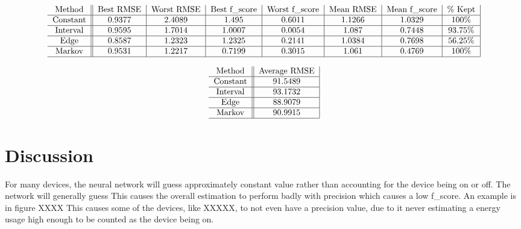 \documentclass{article}
\begin{document}
\begin{table*}[t]
	\centering
	
	$$\begin{tabular}{c||c|c|c|c|c|c|c|}
	Method & Best RMSE & Worst RMSE & Best f\_score & Worst f\_score & Mean RMSE & Mean f\_score & \% Kept\\
	\hline
	Constant & 0.9377 & 2.4089 & 1.495 & 0.6011 & 1.1266 & 1.0329 & 100\% \\
	\hline
	Interval & 0.9595 & 1.7014 & 1.0007 & 0.0054 & 1.087 & 0.7448 & 93.75\% \\
	\hline
	Edge & 0.8587 & 1.2323 & 1.2325 & 0.2141 & 1.0384 & 0.7698 & 56.25\%  \\
	\hline
	Markov & 0.9531 & 1.2217 & 0.7199 & 0.3015 & 1.061 & 0.4769 & 100\%  \\
	\hline
	\end{tabular}$$
	
	 \label{tab:PreproccesVsRawNetworkError} 
\end{table*}


\begin{table*}[t]
	\centering
	
$$\begin{tabular}{c||c|}
Method & Average RMSE\\
\hline
Constant & 91.5489\\
\hline
Interval & 93.1732 \\
\hline
Edge & 88.9079 \\
\hline
Markov & 90.9915 \\
\hline
\end{tabular}$$
 \label{tab:PreprocessVsRawRMSE}
\end{table*}


\section{Discussion} \label{sec:Discussion}

For many devices, the neural network will guess approximately constant value rather than accounting for the device being on or off.
The network will generally guess 
This causes the overall estimation to perform badly with precision which causes a low f\_score.
An example is in figure XXXX
This causes some of the devices, like XXXXX, to not even have a precision value, due to it never estimating a energy usage high enough to be counted as the device being on.
\end{document}
